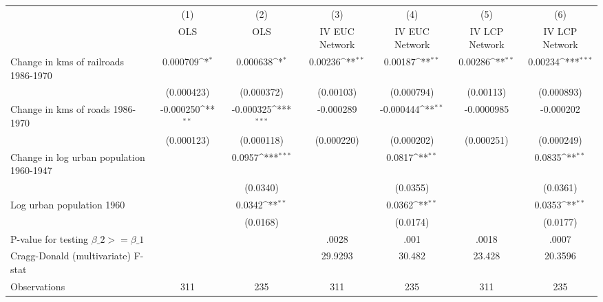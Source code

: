 {
\def\sym#1{\ifmmode^{#1}\else\(^{#1}\)\fi}
\begin{tabular}{l*{6}{c}}
\hline\hline
                &\multicolumn{1}{c}{(1)}&\multicolumn{1}{c}{(2)}&\multicolumn{1}{c}{(3)}&\multicolumn{1}{c}{(4)}&\multicolumn{1}{c}{(5)}&\multicolumn{1}{c}{(6)}\\
                &\multicolumn{1}{c}{OLS}&\multicolumn{1}{c}{OLS}&\multicolumn{1}{c}{IV EUC Network}&\multicolumn{1}{c}{IV EUC Network}&\multicolumn{1}{c}{IV LCP Network}&\multicolumn{1}{c}{IV LCP Network}\\
\hline
Change in kms of railroads 1986-1970& 0.000709\sym{*}  & 0.000638\sym{*}  &  0.00236\sym{**} &  0.00187\sym{**} &  0.00286\sym{**} &  0.00234\sym{***}\\
                &(0.000423)         &(0.000372)         &(0.00103)         &(0.000794)         &(0.00113)         &(0.000893)         \\
[1em]
Change in kms of roads 1986-1970&-0.000250\sym{**} &-0.000325\sym{***}&-0.000289         &-0.000444\sym{**} &-0.0000985         &-0.000202         \\
                &(0.000123)         &(0.000118)         &(0.000220)         &(0.000202)         &(0.000251)         &(0.000249)         \\
[1em]
Change in log urban population 1960-1947&                  &   0.0957\sym{***}&                  &   0.0817\sym{**} &                  &   0.0835\sym{**} \\
                &                  & (0.0340)         &                  & (0.0355)         &                  & (0.0361)         \\
[1em]
Log urban population 1960&                  &   0.0342\sym{**} &                  &   0.0362\sym{**} &                  &   0.0353\sym{**} \\
                &                  & (0.0168)         &                  & (0.0174)         &                  & (0.0177)         \\
\hline
P-value for testing $\beta\_{2} >= \beta\_{1}$&                  &                  &    .0028         &     .001         &    .0018         &    .0007         \\
Cragg-Donald (multivariate) F-stat&                  &                  &  29.9293         &   30.482         &   23.428         &  20.3596         \\
Observations    &      311         &      235         &      311         &      235         &      311         &      235         \\
\hline\hline
\end{tabular}
}
